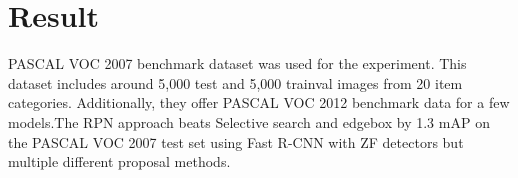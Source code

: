 \documentclass{article}
\begin{document}
\section{Result}
PASCAL VOC 2007 benchmark dataset was used for the experiment. This dataset includes around 5,000 test and 5,000 trainval images from 20 item categories. Additionally, they offer PASCAL VOC 2012 benchmark data for a few models.The RPN approach beats Selective search and edgebox by 1.3 mAP on the PASCAL VOC 2007 test set using Fast R-CNN with ZF detectors but multiple different proposal methods.
\end{document}
